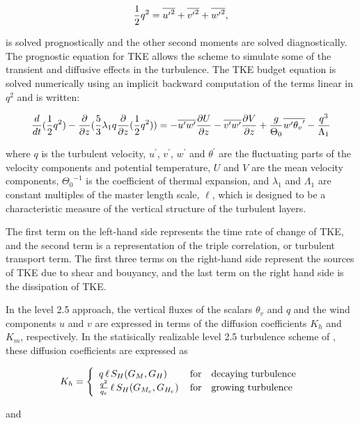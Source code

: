 \[ {\frac{1}{2}}{q^2}={\overline{{u^{\prime}}^2}}+{\overline{{v^{\prime}}^2}}+{\overline{{w^{\prime}}^2}}, \]

is solved prognostically and the other second moments are solved diagnostically.
The prognostic equation for TKE allows the scheme to simulate 
some of the transient and diffusive effects in the turbulence. The TKE budget equation
is solved numerically using an implicit backward computation of the terms linear in $q^2$
and is written:

\[
{\frac{d }{d t} ({{\frac{1}{2}} q^2})} - { \frac{\partial }{\partial z} ({ \frac{5}{3} {{\lambda}_1} q { \frac{\partial }{\partial z} 
({\frac{1}{2}}q^2)} })} =
{- \overline{{u^{\prime}}{w^{\prime}}} { \frac{\partial U}{\partial z} }} - {\overline{{v^{\prime}}{w^{\prime}}} 
{ \frac{\partial V}{\partial z} }} + {\frac{g}{\Theta_0}{\overline{{w^{\prime}}{{{\theta}_v}^{\prime}}}}
- \frac{ q^3}{{\Lambda}_1} }
\]

where $q$ is the turbulent velocity, ${u^{\prime}}$, ${v^{\prime}}$, ${w^{\prime}}$ and 
${{\theta}^{\prime}}$ are the fluctuating parts of the velocity components and potential 
temperature, $U$ and $V$ are the mean velocity components, ${\Theta_0}^{-1}$ is the
coefficient of thermal expansion, and ${{\lambda}_1}$ and ${{\Lambda} _1}$ are constant
multiples of the master length scale, $\ell$, which is designed to be a characteristic measure
of the vertical structure of the turbulent layers.

The first term on the left-hand side represents the time rate of change of TKE, and
the second term is a representation of the triple correlation, or turbulent
transport term. The first three terms on the right-hand side represent the sources of
TKE due to shear and bouyancy, and the last term on the right hand side is the dissipation
of TKE.

In the level 2.5 approach, the vertical fluxes of the scalars $\theta_v$ and $q$ and the
wind components $u$ and $v$ are expressed in terms of the diffusion coefficients $K_h$ and
$K_m$, respectively.  In the statisically realizable level 2.5 turbulence scheme of 
\cite{helflab:88}, these diffusion coefficients are expressed as

\[
K_h 
 = \left\{ \begin{array}{l@{\quad\mbox{for}\quad}l} q \, \ell \, S_H(G_M,G_H) \, & \mbox{decaying turbulence}
\\ \frac{ q^2 }{ q_e } \, \ell \, S_{H}(G_{M_e},G_{H_e}) \, & \mbox{growing turbulence} \end{array} \right.
\]

and

